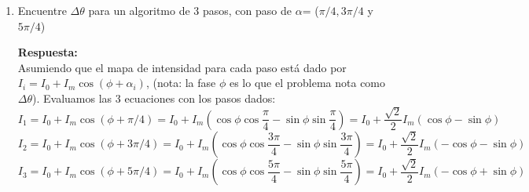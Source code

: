\documentclass[12pt]{article}
\begin{document}
\begin{enumerate}
		\vspace{0.2cm}
		\textcolor{blue!70!black}{\textbf{Respuesta:}} \\
		\textbf{Definición:} La interferometría de medición de fase (Phase Measurement Interferometry - PMI) es un conjunto de técnicas para recuperar cuantitativamente el mapa de fase óptica $\phi(x,y)$ a partir de los patrones de franjas registrados, eliminando la ambigüedad del signo y la influencia de la intensidad de fondo y modulación. \\
		\textbf{Técnicas/Métodos que existen:}
		\begin{itemize}
			\item \textbf{Desplazamiento de Fase Temporal (Phase Shifting):} Se altera la fase de referencia secuencialmente en pasos definidos, tomando imágenes para cada paso. Ejemplos: Algoritmo de 3 pasos, 4 pasos, Carré, Hariharan (5 pasos).
			\item \textbf{Desplazamiento de Fase Espacial (Spatial Carrier):} Se genera una alta frecuencia espacial (franjas densas) inclinando el frente de onda de referencia y se recupera la fase de una sola imagen.
			\item \textbf{Método de Transformada de Fourier (FFT):} Separación en el espacio de frecuencias de las componentes moduladas de la intensidad.
		\end{itemize}
		
		\vspace{0.5cm}
		\item Encuentre $\Delta\theta$ para un algoritmo de 3 pasos, con paso de $\alpha$= ($\pi/4, 3\pi/4$ y $5\pi/4$)
		
		\vspace{0.2cm}
		\textcolor{blue!70!black}{\textbf{Respuesta:}} \\
		Asumiendo que el mapa de intensidad para cada paso está dado por $I_i = I_0 + I_m \cos(\phi + \alpha_i)$, (nota: la fase $\phi$ es lo que el problema nota como $\Delta\theta$).
		Evaluamos las 3 ecuaciones con los pasos dados:
		\[ I_1 = I_0 + I_m \cos(\phi + \pi/4) = I_0 + I_m \left(\cos\phi \cos\frac{\pi}{4} - \sin\phi \sin\frac{\pi}{4}\right) = I_0 + \frac{\sqrt{2}}{2} I_m(\cos\phi - \sin\phi) \]
		\[ I_2 = I_0 + I_m \cos(\phi + 3\pi/4) = I_0 + I_m \left(\cos\phi \cos\frac{3\pi}{4} - \sin\phi \sin\frac{3\pi}{4}\right) = I_0 + \frac{\sqrt{2}}{2} I_m(-\cos\phi - \sin\phi) \]
		\[ I_3 = I_0 + I_m \cos(\phi + 5\pi/4) = I_0 + I_m \left(\cos\phi \cos\frac{5\pi}{4} - \sin\phi \sin\frac{5\pi}{4}\right) = I_0 + \frac{\sqrt{2}}{2} I_m(-\cos\phi + \sin\phi) \]
		

\end{enumerate}
\end{document}
